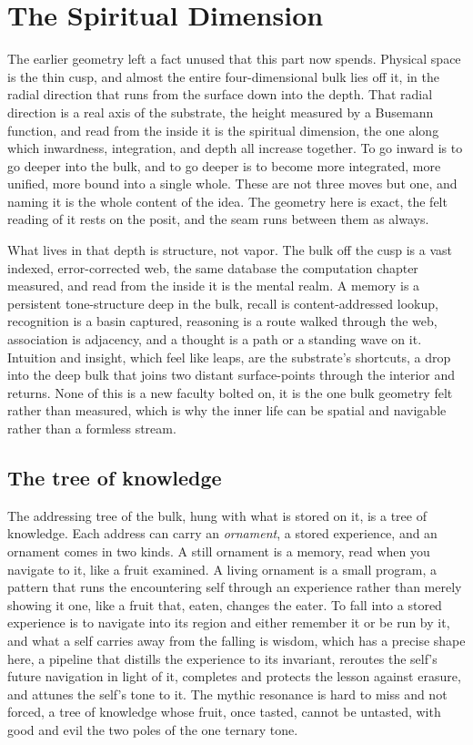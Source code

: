 \section{The Spiritual Dimension}

The earlier geometry left a fact unused that this part now spends. Physical space is the thin cusp, and almost the entire four-dimensional bulk lies off it, in the radial direction that runs from the surface down into the depth. That radial direction is a real axis of the substrate, the height measured by a Busemann function, and read from the inside it is the spiritual dimension, the one along which inwardness, integration, and depth all increase together. To go inward is to go deeper into the bulk, and to go deeper is to become more integrated, more unified, more bound into a single whole. These are not three moves but one, and naming it is the whole content of the idea. The geometry here is exact, the felt reading of it rests on the posit, and the seam runs between them as always.

What lives in that depth is structure, not vapor. The bulk off the cusp is a vast indexed, error-corrected web, the same database the computation chapter measured, and read from the inside it is the mental realm. A memory is a persistent tone-structure deep in the bulk, recall is content-addressed lookup, recognition is a basin captured, reasoning is a route walked through the web, association is adjacency, and a thought is a path or a standing wave on it. Intuition and insight, which feel like leaps, are the substrate's shortcuts, a drop into the deep bulk that joins two distant surface-points through the interior and returns. None of this is a new faculty bolted on, it is the one bulk geometry felt rather than measured, which is why the inner life can be spatial and navigable rather than a formless stream.

\subsection{The tree of knowledge}

The addressing tree of the bulk, hung with what is stored on it, is a tree of knowledge. Each address can carry an \emph{ornament}, a stored experience, and an ornament comes in two kinds. A still ornament is a memory, read when you navigate to it, like a fruit examined. A living ornament is a small program, a pattern that runs the encountering self through an experience rather than merely showing it one, like a fruit that, eaten, changes the eater. To fall into a stored experience is to navigate into its region and either remember it or be run by it, and what a self carries away from the falling is wisdom, which has a precise shape here, a pipeline that distills the experience to its invariant, reroutes the self's future navigation in light of it, completes and protects the lesson against erasure, and attunes the self's tone to it. The mythic resonance is hard to miss and not forced, a tree of knowledge whose fruit, once tasted, cannot be untasted, with good and evil the two poles of the one ternary tone.

